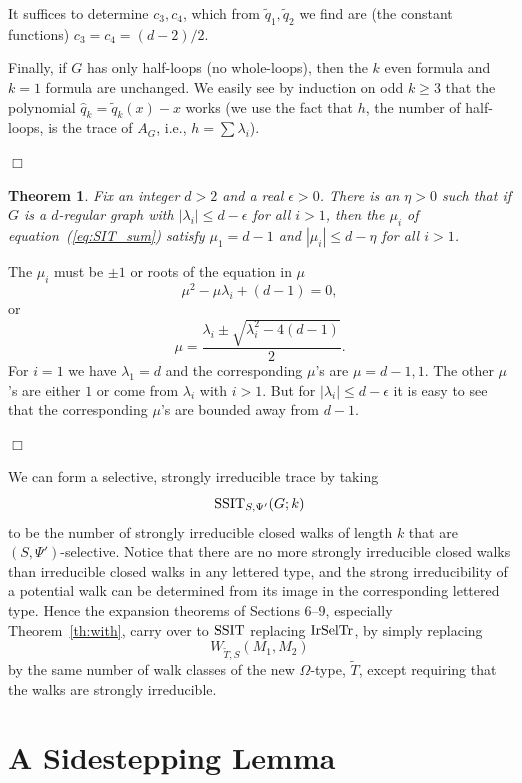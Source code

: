 \documentclass[12pt]{article}
\newtheorem{theorem}{Theorem}[section]
\newcommand{\tset}{{\Psi}}
\newcommand{\irdsel}{{\rm IrSelTr}}
\newcommand{\ssit}{{\rm SSIT}}
\newcommand{\proof}{{\par\noindent {\bf Proof}\space\space}}
\newcommand{\proofbox}{\begin{flushright}$\Box$\end{flushright}}
\newcommand{\ird}[1]{{\rm Irred}_{#1}}
\begin{document}
It suffices to determine
$c_3,c_4$, which from $\widetilde q_1,\widetilde q_2$ we find are
(the constant functions) $c_3=c_4=(d-2)/2$.

Finally, if $G$ has only half-loops (no whole-loops),
then the $k$ even formula and $k=1$ formula
are unchanged.
We easily see by induction on odd $k\ge 3$ that the polynomial $\widehat q_k
=\widetilde q_k(x)-x$ works (we use the fact that $h$, the number of
half-loops, is the trace of $A_G$, i.e., $h=\sum\lambda_i$).
\proofbox

\begin{theorem} Fix an integer $d>2$ and a real
$\epsilon>0$.  There
is an $\eta>0$ such that if $G$ is a $d$-regular graph with
$|\lambda_i|\le d-\epsilon$ for all $i>1$, then the $\mu_i$ of
equation~(\ref{eq:SIT_sum}) satisfy $\mu_1=d-1$ and
$|\mu_i|\le d-\eta$ for all $i>1$.
\end{theorem}
\proof The $\mu_i$ must be $\pm 1$ or roots of the equation in $\mu$
$$
\mu^2-\mu\lambda_i+(d-1)=0,
$$
or
$$
\mu =  \frac{\lambda_i \pm \sqrt{\lambda_i^2-4(d-1)}}{2}.
$$
For $i=1$ we have $\lambda_1=d$ and the corresponding $\mu$'s are
$\mu=d-1,1$.  
The other $\mu$'s are either $1$ or come from $\lambda_i$ with
$i>1$.  But for $|\lambda_i|\le d-\epsilon$ it is easy to see that
the corresponding $\mu$'s are bounded away from $d-1$.
\proofbox

We can form a selective, strongly irreducible trace by taking
$$
\ssit_{S,\tset'}(G;k)
$$
to be the number of strongly irreducible closed walks of length $k$ that
are $(S,\tset')$-selective.  Notice that there are no more strongly
irreducible closed walks than irreducible closed walks in any lettered type,
and the strong irreducibility of a potential walk can
be determined from its image in the corresponding lettered type.
Hence the expansion theorems of Sections 6--9, especially
Theorem~\ref{th:with}, carry over to $\ssit$ replacing $\irdsel$,
by simply replacing
$$
W_{\widetilde T,S}(M_1,M_2)
$$
by the same number of walk classes of the new $\Omega$-type, $\widetilde T$, 
except requiring that the walks are strongly irreducible.
\section{A Sidestepping Lemma}
\end{document}
